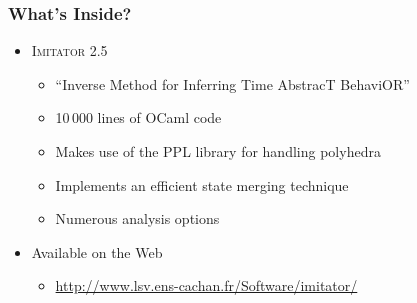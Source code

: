 \documentclass[professionalfont]{beamer}
\newcommand{\couleur}[1]{\textcolor{couleurimportante}{#1}}
\newcommand{\refer}[1]{\textcolor{couleurref}{\cite{#1}}}
\newcommand{\imitator}{\textsc{Imitator}}
\newcommand{\ocaml}{OCaml}
\begin{document}
\begin{frame}
 \frametitle{What's Inside?}
\begin{itemize}
	\item \couleur{\imitator{}} 2.5 \refer{afks12}

	\begin{itemize}
		\item ``\couleur{I}nverse \couleur{M}ethod for \couleur{I}nferring \couleur{T}ime \couleur{A}bstrac\couleur{T} Behavi\couleur{OR}''
		\item 10\,000 lines of \couleur{\ocaml{}} code
		\item Makes use of the \couleur{PPL} library for handling polyhedra \refer{bhz08}
		\item Implements an efficient state \couleur{merging technique} \refer{AFS12}
		\item Numerous analysis \couleur{options}
	\end{itemize}

	\bigskip
% 
% 

	\bigskip

	\item Available on the Web

	\begin{itemize}
		\item \couleur{\url{http://www.lsv.ens-cachan.fr/Software/imitator/}}
	\end{itemize}

% 	
% 


\end{itemize}

\end{frame}
\end{document}

